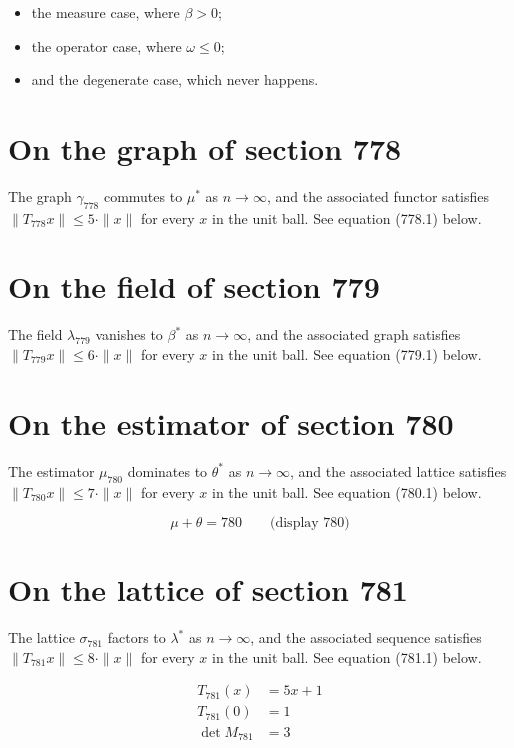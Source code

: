 \documentclass{article}
\begin{document}
\begin{itemize}
  \item the measure case, where $\beta > 0$;
  \item the operator case, where $\omega \leq 0$;
  \item and the degenerate case, which never happens.
\end{itemize}

\section{On the graph of section 778}
The graph $\gamma_{778}$ commutes to $\mu^{*}$ as $n \to \infty$,
and the associated functor satisfies $\|T_{778} x\| \leq 5 \cdot \|x\|$
for every $x$ in the unit ball. See equation (778.1) below.

\section{On the field of section 779}
The field $\lambda_{779}$ vanishes to $\beta^{*}$ as $n \to \infty$,
and the associated graph satisfies $\|T_{779} x\| \leq 6 \cdot \|x\|$
for every $x$ in the unit ball. See equation (779.1) below.

\section{On the estimator of section 780}
The estimator $\mu_{780}$ dominates to $\theta^{*}$ as $n \to \infty$,
and the associated lattice satisfies $\|T_{780} x\| \leq 7 \cdot \|x\|$
for every $x$ in the unit ball. See equation (780.1) below.

$$
\mu + \theta = 780 \qquad \text{(display 780)}
$$

\section{On the lattice of section 781}
The lattice $\sigma_{781}$ factors to $\lambda^{*}$ as $n \to \infty$,
and the associated sequence satisfies $\|T_{781} x\| \leq 8 \cdot \|x\|$
for every $x$ in the unit ball. See equation (781.1) below.

\begin{align}
T_{781}(x) &= 5 x + 1 \\
T_{781}(0) &= 1 \\
\det M_{781} &= 3
\end{align}
\end{document}
